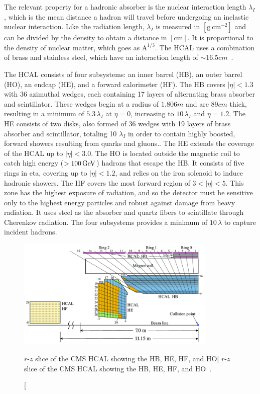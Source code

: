 The relevant property for a hadronic absorber is the nuclear interaction length $\lambda_I$, which is the mean distance a hadron will travel before undergoing an inelastic nuclear interaction. Like the radiation length, $\lambda_I$ is measured in $\left[\si{\gram\ \centi\metre^{-2}}\right]$ and can be divided by the density to obtain a distance in $\left[\si{\centi\meter}\right]$. It is proportional to the density of nuclear matter, which goes as $\text{A}^{1/3}$. The HCAL uses a combination of brass and stainless steel, which have an interaction length of $\sim16.5\unit{cm}$~\cite{Baiatian:1049915}.

The HCAL consists of four subsystems: an inner barrel (HB), an outer barrel (HO), an endcap (HE), and a forward calorimeter (HF). The HB covers $\left|\eta\right|<1.3$ with 36 azimuthal wedges, each containing 17 layers of alternating brass absorber and scintillator. These wedges begin at a radius of $1.806\unit{m}$ and are $89\unit{cm}$ thick, resulting in a minimum of $5.3\,\lambda_I$ at $\eta=0$, increasing to $10\,\lambda_I$ and $\eta=1.2$. The HE consists of two disks, also formed of 36 wedges with 19 layers of brass absorber and scintillator, totaling 10 $\lambda_I$ in order to contain highly boosted, forward showers resulting from quarks and gluons.. The HE extends the coverage of the HCAL up to $\left|\eta\right| < 3.0$. The HO is located outside the magnetic coil to catch high energy ($>100\,\text{Ge\hspace{-.08em}V}$) hadrons that escape the HB. It consists of five rings in eta, covering up to $\left|\eta\right|<1.2$, and relies on the iron solenoid to induce hadronic showers. The HF covers the most forward region of $3<\left|\eta\right|<5$. This zone has the highest exposure of radiation, and so the detector must be sensitive only to the highest energy particles and robust against damage from heavy radiation. It uses steel as the absorber and quartz fibers to scintillate through Cherenkov radiation. The four subsystems provides a minimum of $10\,\lambda$ to capture incident hadrons.

\begin{figure}[htpb]
	\centering
	\includegraphics[width=0.85\textwidth]{figs/03_experiment/A-schematic-view-of-one-quarter-of-the-CMS-HCAL-during-2016-LHC-operation-showing-the.png}
	\caption
	[$r$-$z$ slice of the CMS HCAL showing the HB, HE, HF, and HO]
	{$r$-$z$ slice of the CMS HCAL showing the HB, HE, HF, and HO~\cite{Sirunyan:2691403}.}
	\label{fig:hcal}
\end{figure}

